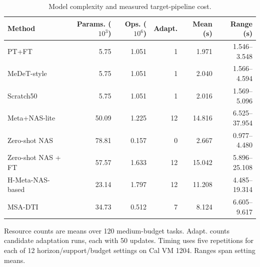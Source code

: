 \begin{table}[pos=!htbp]
\centering\footnotesize
\caption{Model complexity and measured target-pipeline cost.}\label{tab:cost}
\begin{tabular}{lrrrrr}
\toprule
Method & Params. ($10^3$) & Ops. ($10^6$) & Adapt. & Mean (s) & Range (s)\\\midrule
PT+FT & 5.75 & 1.051 & 1 & 1.971 & 1.546--3.548\\
MeDeT-style & 5.75 & 1.051 & 1 & 2.040 & 1.566--4.594\\
Scratch50 & 5.75 & 1.051 & 1 & 2.016 & 1.569--5.096\\
Meta+NAS-lite & 50.09 & 1.225 & 12 & 14.816 & 6.525--37.954\\
Zero-shot NAS & 78.81 & 0.157 & 0 & 2.667 & 0.977--4.480\\
Zero-shot NAS + FT & 57.57 & 1.633 & 12 & 15.042 & 5.896--25.108\\
H-Meta-NAS-based & 23.14 & 1.797 & 12 & 11.208 & 4.485--19.314\\
MSA-DTI & 34.73 & 0.512 & 7 & 8.124 & 6.605--9.617\\
\bottomrule
\end{tabular}
\par\vspace{3pt}\begin{minipage}{\linewidth}\footnotesize Resource counts are means over 120 medium-budget tasks. Adapt. counts candidate adaptation runs, each with 50 updates. Timing uses five repetitions for each of 12 horizon/support/budget settings on Cal VM 1204. Ranges span setting means.\end{minipage}
\end{table}
